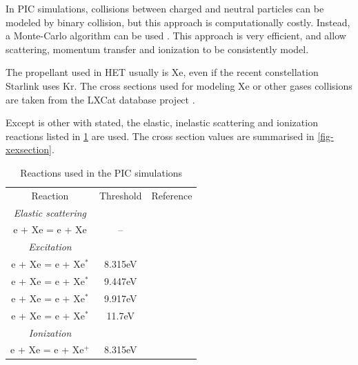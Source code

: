     In \ac{PIC} simulations, collisions between charged and neutral particles can be modeled by binary collision, but this approach is computationally costly.
    Instead, a Monte-Carlo algorithm can be used \cite{vahedi1995}.
    This approach is very efficient, and allow scattering, momentum transfer and ionization to be consistently model.

    The propellant used in \ac{HET} usually is \ac{Xe}, even if the recent constellation Starlink uses \ac{Kr}.
    The cross sections used for modeling \ac{Xe} or other gases collisions are taken from the {\sc LXCat} database project \cite{LXCat_web}.

    Except is other with stated, the elastic, inelastic scattering and ionization reactions listed in \cref{tab-reactXe} are used.
    The cross section values are summarised in \cref{fig-xexsection}.

    \begin{table}[hbtp]
      \centering
      \caption{Reactions used in the PIC simulations}
      \label{tab-reactXe}
      \begin{tabular}{ccc}
        Reaction & Threshold & Reference\\
        {\it Elastic scattering} & &\\
        e + Xe = e + Xe   & --   & \cite{Lxcat_Xe,Lxcat_Xe2} \\
        {\it Excitation} & &\\
        e + Xe = e + Xe$^*$   & 8.315eV   & \cite{Lxcat_Xe,Lxcat_Xe2} \\
        e + Xe = e + Xe$^*$   & 9.447eV   & \cite{Lxcat_Xe,Lxcat_Xe2} \\
        e + Xe = e + Xe$^*$   & 9.917eV   & \cite{Lxcat_Xe,Lxcat_Xe2} \\
        e + Xe = e + Xe$^*$   & 11.7eV    & \cite{Lxcat_Xe,Lxcat_Xe2} \\
        {\it Ionization} & &\\
        e + Xe = e + Xe$^+$   & 8.315eV   & \cite{Lxcat_Xe,Lxcat_Xe2} \\

      \end{tabular}

    \end{table}


